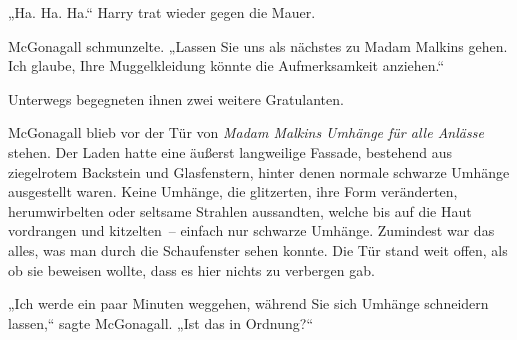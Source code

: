 „Ha. Ha. Ha.“ Harry trat wieder gegen die Mauer.

McGonagall schmunzelte. „Lassen Sie uns als nächstes zu Madam Malkins gehen. Ich glaube, Ihre Muggelkleidung könnte die Aufmerksamkeit anziehen.“

Unterwegs begegneten ihnen zwei weitere Gratulanten.

McGonagall blieb vor der Tür von \emph{Madam Malkins Umhänge für alle Anlässe} stehen. Der Laden hatte eine äußerst langweilige Fassade, bestehend aus ziegelrotem Backstein und Glasfenstern, hinter denen normale schwarze Umhänge ausgestellt waren. Keine Umhänge, die glitzerten, ihre Form veränderten, herumwirbelten oder seltsame Strahlen aussandten, welche bis auf die Haut vordrangen und kitzelten – einfach nur schwarze Umhänge. Zumindest war das alles, was man durch die Schaufenster sehen konnte. Die Tür stand weit offen, als ob sie beweisen wollte, dass es hier nichts zu verbergen gab.

„Ich werde ein paar Minuten weggehen, während Sie sich Umhänge schneidern lassen,“ sagte McGonagall. „Ist das in Ordnung?“

